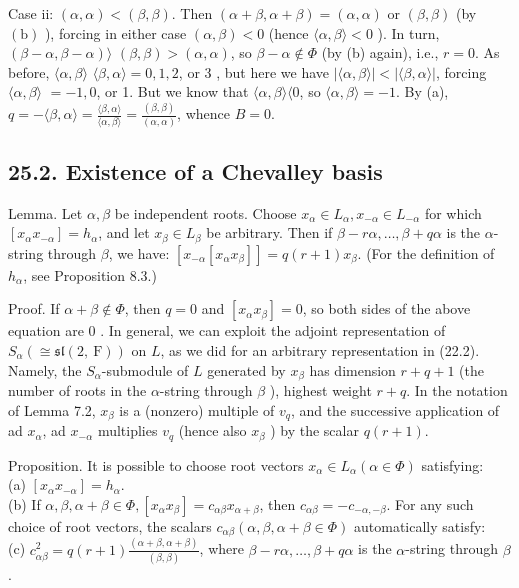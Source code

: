\documentclass[10pt]{article}
\begin{document}
Case ii: $(\alpha, \alpha)<(\beta, \beta)$. Then $(\alpha+\beta, \alpha+\beta)=(\alpha, \alpha)$ or $(\beta, \beta)$ (by $(\mathrm{b})$ ), forcing in either case $(\alpha, \beta)<0$ (hence $\langle\alpha, \beta\rangle<0$ ). In turn, $(\beta-\alpha, \beta-\alpha)\rangle$ $(\beta, \beta)>(\alpha, \alpha)$, so $\beta-\alpha \notin \Phi$ (by (b) again), i.e., $r=0$. As before, $\langle\alpha, \beta\rangle$ $\langle\beta, \alpha\rangle=0,1,2$, or 3 , but here we have $|\langle\alpha, \beta\rangle|<|\langle\beta, \alpha\rangle|$, forcing $\langle\alpha, \beta\rangle$ $=-1,0$, or 1. But we know that $\langle\alpha, \beta\rangle\langle 0$, so $\langle\alpha, \beta\rangle=-1$. By (a), $q=-\langle\beta, \alpha\rangle=\frac{\langle\beta, \alpha\rangle}{\langle\alpha, \beta\rangle}=\frac{(\beta, \beta)}{(\alpha, \alpha)}$, whence $B=0$.

\subsection*{25.2. Existence of a Chevalley basis}
Lemma. Let $\alpha, \beta$ be independent roots. Choose $x_{\alpha} \in L_{\alpha}, x_{-\alpha} \in L_{-\alpha}$ for which $\left[x_{\alpha} x_{-\alpha}\right]=h_{\alpha}$, and let $x_{\beta} \in L_{\beta}$ be arbitrary. Then if $\beta-r \alpha, \ldots, \beta+q \alpha$ is the $\alpha$-string through $\beta$, we have: $\left[x_{-\alpha}\left[x_{\alpha} x_{\beta}\right]\right]=q(r+1) x_{\beta}$. (For the definition of $h_{\alpha}$, see Proposition 8.3.)

Proof. If $\alpha+\beta \notin \Phi$, then $q=0$ and $\left[x_{\alpha} x_{\beta}\right]=0$, so both sides of the above equation are 0 . In general, we can exploit the adjoint representation of $S_{\alpha}(\cong \mathfrak{s l}(2, \mathrm{~F}))$ on $L$, as we did for an arbitrary representation in (22.2). Namely, the $S_{\alpha}$-submodule of $L$ generated by $x_{\beta}$ has dimension $r+q+1$ (the number of roots in the $\alpha$-string through $\beta$ ), highest weight $r+q$. In the notation of Lemma 7.2, $x_{\beta}$ is a (nonzero) multiple of $v_{q}$, and the successive application of ad $x_{\alpha}$, ad $x_{-\alpha}$ multiplies $v_{q}$ (hence also $x_{\beta}$ ) by the scalar $q(r+1)$.

Proposition. It is possible to choose root vectors $x_{\alpha} \in L_{\alpha}(\alpha \in \Phi)$ satisfying:\\
(a) $\left[x_{\alpha} x_{-\alpha}\right]=h_{\alpha}$.\\
(b) If $\alpha, \beta, \alpha+\beta \in \Phi,\left[x_{\alpha} x_{\beta}\right]=c_{\alpha \beta} x_{\alpha+\beta}$, then $c_{\alpha \beta}=-c_{-\alpha,-\beta}$. For any such choice of root vectors, the scalars $c_{\alpha \beta}(\alpha, \beta, \alpha+\beta \in \Phi)$ automatically satisfy:\\
(c) $c_{\alpha \beta}^{2}=q(r+1) \frac{(\alpha+\beta, \alpha+\beta)}{(\beta, \beta)}$, where $\beta-r \alpha, \ldots, \beta+q \alpha$ is the $\alpha$-string through $\beta$.
\end{document}
